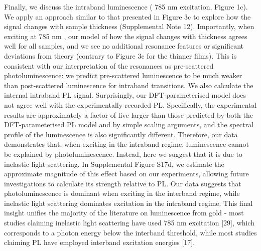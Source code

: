 \documentclass[10pt]{article}
\begin{document}
Finally, we discuss the intraband luminescence ( 785 nm excitation, Figure 1c). We apply an approach similar to that presented in Figure 3c to explore how the signal changes with sample thickness (Supplemental Note 12). Importantly, when exciting at 785 nm , our model of how the signal changes with thickness agrees well for all samples, and we see no additional resonance features or significant deviations from theory (contrary to Figure 3c for the thinner films). This is consistent with our interpretation of the resonances as pre-scattered photoluminescence: we predict pre-scattered luminescence to be much weaker than post-scattered luminescence for intraband transitions. We also calculate the internal intraband PL signal. Surprisingly, our DFT-parameterised model does not agree well with the experimentally recorded PL. Specifically, the experimental results are approximately a factor of five larger than those predicted by both the DFT-parameterised PL model and by simple scaling arguments, and the spectral profile of the luminescence is also significantly different. Therefore, our data demonstrates that, when exciting in the intraband regime, luminescence cannot be explained by photoluminescence. Instead, here we suggest that it is due to inelastic light scattering. In Supplemental Figure S17d, we estimate the approximate magnitude of this effect based on our experiments, allowing future investigations to calculate its strength relative to PL. Our data suggests that photoluminescence is dominant when exciting in the interband regime, while inelastic light scattering dominates excitation in the intraband regime. This final insight unifies the majority of the literature on luminescence from gold - most studies claiming inelastic light scattering have used 785 nm excitation [29], which corresponds to a photon energy below the interband threshold, while most studies claiming PL have employed interband excitation energies [17].
\end{document}

